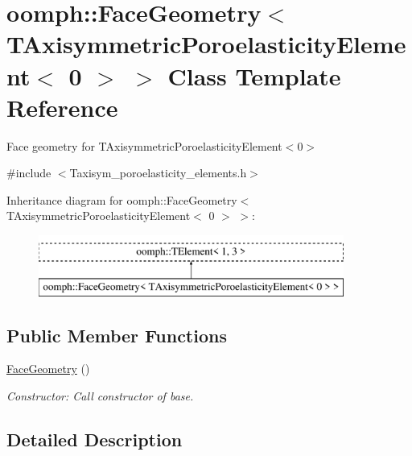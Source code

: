 \hypertarget{classoomph_1_1FaceGeometry_3_01TAxisymmetricPoroelasticityElement_3_010_01_4_01_4}{}\section{oomph\+:\+:Face\+Geometry$<$ T\+Axisymmetric\+Poroelasticity\+Element$<$ 0 $>$ $>$ Class Template Reference}
\label{classoomph_1_1FaceGeometry_3_01TAxisymmetricPoroelasticityElement_3_010_01_4_01_4}


Face geometry for T\+Axisymmetric\+Poroelasticity\+Element$<$0$>$  




{\ttfamily \#include $<$Taxisym\+\_\+poroelasticity\+\_\+elements.\+h$>$}

Inheritance diagram for oomph\+:\+:Face\+Geometry$<$ T\+Axisymmetric\+Poroelasticity\+Element$<$ 0 $>$ $>$\+:\begin{figure}[H]
\begin{center}
\leavevmode
\includegraphics[height=2.000000cm]{classoomph_1_1FaceGeometry_3_01TAxisymmetricPoroelasticityElement_3_010_01_4_01_4}
\end{center}
\end{figure}
\subsection*{Public Member Functions}
\begin{DoxyCompactItemize}
\item 
\hyperlink{classoomph_1_1FaceGeometry_3_01TAxisymmetricPoroelasticityElement_3_010_01_4_01_4_a29e20c532b17421fbff9640cbc6aee0c}{Face\+Geometry} ()
\begin{DoxyCompactList}\small\item\em Constructor\+: Call constructor of base. \end{DoxyCompactList}\end{DoxyCompactItemize}


\subsection{Detailed Description}
